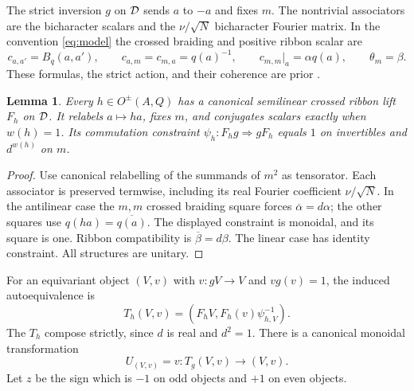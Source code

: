 \documentclass{amsart}
\newtheorem{lemma}[theorem]{Lemma}
\theoremstyle{definition}\newtheorem{definition}[theorem]{Definition}
\theoremstyle{remark}\newtheorem{remark}[theorem]{Remark}
\begin{document}
The strict inversion $g$ on $\mathcal D$ sends $a$ to $-a$ and fixes $m$.
The nontrivial associators are the bicharacter scalars and the
$\nu/\sqrt N$ bicharacter Fourier matrix. In the convention
\eqref{eq:model} the crossed braiding and positive ribbon scalar are
\begin{equation}\label{eq:braiding}
 c_{a,a'}=B_q(a,a'),\qquad c_{a,m}=c_{m,a}=q(a)^{-1},\qquad
 c_{m,m}|_a=\alpha q(a),\qquad \theta_m=\beta.
\end{equation}
These formulas, the strict action, and their coherence are prior
\cite[Theorem 4.9]{Gal}\cite[Theorem 3.2 and Corollary 3.9]{GLM}.

\begin{lemma}\label{lem:lift}
Every $h\in O^{\pm}(A,Q)$ has a canonical semilinear crossed ribbon lift
$F_h$ on $\mathcal D$. It relabels $a\mapsto ha$, fixes $m$, and conjugates
scalars exactly when $w(h)=1$. Its commutation constraint
$\psi_h:F_hg\Rightarrow gF_h$ equals $1$ on invertibles and
$d^{w(h)}$ on $m$.
\end{lemma}
\begin{proof}
Use canonical relabelling of the summands of $m^2$ as tensorator.
Each associator is preserved termwise, including its real Fourier
coefficient $\nu/\sqrt N$. In the antilinear case the $m,m$ crossed
braiding square forces $\overline\alpha=d\alpha$; the other squares
use $q(ha)=\overline{q(a)}$. The displayed constraint is monoidal,
and its square is one. Ribbon compatibility is
$\overline\beta=d\beta$. The linear case has identity constraint.
All structures are unitary.
\end{proof}

For an equivariant object $(V,v)$ with $v:gV\to V$ and $v g(v)=1$,
the induced autoequivalence is
\begin{equation}\label{eq:T}
       T_h(V,v)=(F_hV,F_h(v)\psi_{h,V}^{-1}).
\end{equation}
The $T_h$ compose strictly, since $d$ is real and $d^2=1$.
There is a canonical monoidal transformation
\begin{equation}\label{eq:U}
                  U_{(V,v)}=v:T_g(V,v)\longrightarrow(V,v).
\end{equation}
Let $z$ be the sign which is $-1$ on odd objects and $+1$ on even objects.
\end{document}
